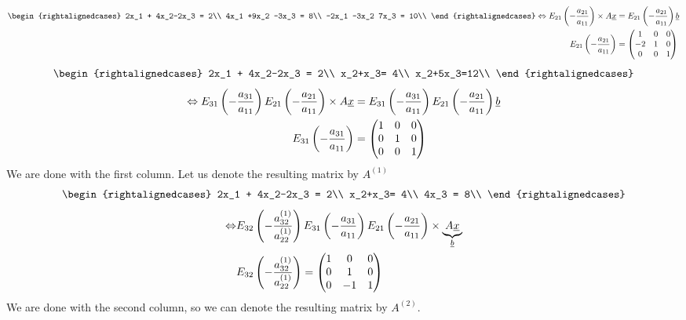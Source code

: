 \begin{example}
\begin{align*}
\begin{rightalignedcases}
2x_1 + 4x_2-2x_3 = 2\\
4x_1 +9x_2 -3x_3 = 8\\
-2x_1 -3x_2 7x_3 = 10\\	
\end{rightalignedcases}
\Leftrightarrow E_{21}\left( -\frac{a_{21}}{a_{11}}\right)\times A\ul{x} &= E_{21}\left( -\frac{a_{21}}{a_{11}}\right)\ul{b}\\
E_{21}\left( -\frac{a_{21}}{a_{11}}\right) &= \begin{pmatrix}
1 & 0 & 0\\
-2 & 1 & 0\\
0 & 0 & 1
\end{pmatrix}
\end{align*}
\[
\begin{rightalignedcases}
2x_1 + 4x_2-2x_3 = 2\\
x_2+x_3= 4\\
x_2+5x_3=12\\	
\end{rightalignedcases}
\]
\begin{align*}
\Leftrightarrow E_{31}\left( -\frac{a_{31}}{a_{11}}\right)E_{21}\left( -\frac{a_{21}}{a_{11}}\right)\times A\underline{x} &= E_{31}\left( -\frac{a_{31}}{a_{11}}\right)E_{21}\left( -\frac{a_{21}}{a_{11}}\right)\underline{b}\\
E_{31}\left( -\frac{a_{31}}{a_{11}}\right) &= \begin{pmatrix}
1 & 0 & 0\\
0 & 1 & 0\\
0 & 0 & 1
\end{pmatrix}
\end{align*}
We are done with the first column. Let us denote the resulting matrix by $A^{(1)}$
\[
\begin{rightalignedcases}
2x_1 + 4x_2-2x_3 = 2\\
x_2+x_3= 4\\
4x_3 = 8\\	
\end{rightalignedcases}
\]
\begin{align*}
\Leftrightarrow &E_{32}\left( -\frac{a_{32}^{(1)}}{a_{22}^{(1)}}\right)E_{31}\left( -\frac{a_{31}}{a_{11}}\right)E_{21}\left( -\frac{a_{21}}{a_{11}}\right)\times \underbrace{A\underline{x}}_{\underline{b}}\\
&E_{32}\left( -\frac{a_{32}^{(1)}}{a_{22}^{(1)}}\right) = \begin{pmatrix}
1 & 0 & 0\\
0 & 1 & 0\\
0 & -1 & 1
\end{pmatrix}
\end{align*}
We are done with the second column, so we can denote the resulting matrix by $A^{(2)}$.\\


\end{example}

